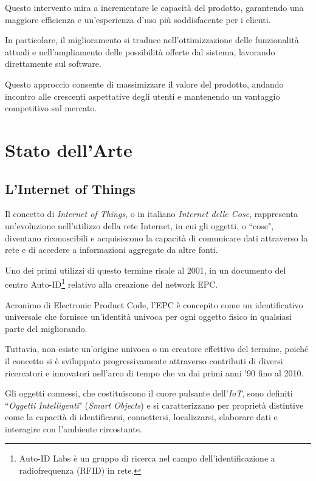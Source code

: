 \documentclass[12pt,a4paper,openright,twoside]{book}
\begin{document}
            Questo intervento mira a incrementare le capacità del prodotto, garantendo una maggiore efficienza e un’esperienza d’uso più soddisfacente per i clienti.

            In particolare, il miglioramento si traduce nell’ottimizzazione delle funzionalità attuali e nell’ampliamento delle possibilità offerte dal sistema, lavorando direttamente sul software.

            Questo approccio consente di massimizzare il valore del prodotto, andando incontro alle crescenti aspettative degli utenti e mantenendo un vantaggio competitivo sul mercato.

\chapter{Stato dell'Arte}

    \section{L'Internet of Things}

        Il concetto di \textit{Internet of Things}, o in italiano \textit{Internet delle Cose}, rappresenta un'evoluzione nell'utilizzo della rete Internet, in cui gli oggetti, o ``cose", diventano riconoscibili e acquisiscono la capacità di comunicare dati attraverso la rete e di accedere a informazioni aggregate da altre fonti.

        Uno dei primi utilizzi di questo termine risale al 2001, in un documento del centro Auto-ID\footnote{Auto-ID Labs è un gruppo di ricerca nel campo dell'identificazione a radiofrequenza (RFID) in rete.
        } relativo alla creazione del network EPC.

        Acronimo di Electronic Product Code, l'EPC è concepito come un identificativo universale che fornisce un'identità univoca per ogni oggetto fisico in qualsiasi parte del migliorando.

        Tuttavia, non esiste un'origine univoca o un creatore effettivo del termine, poiché il concetto si è sviluppato progressivamente attraverso contributi di diversi ricercatori e innovatori nell'arco di tempo che va dai primi anni '90 fino al 2010.

        Gli oggetti connessi, che costituiscono il cuore pulsante dell’\textit{IoT}, sono definiti ``\textit{Oggetti Intelligenti}" (\textit{Smart Objects}) e si caratterizzano per proprietà distintive come la capacità di identificarsi, connettersi, localizzarsi, elaborare dati e interagire con l'ambiente circostante.
\end{document}
